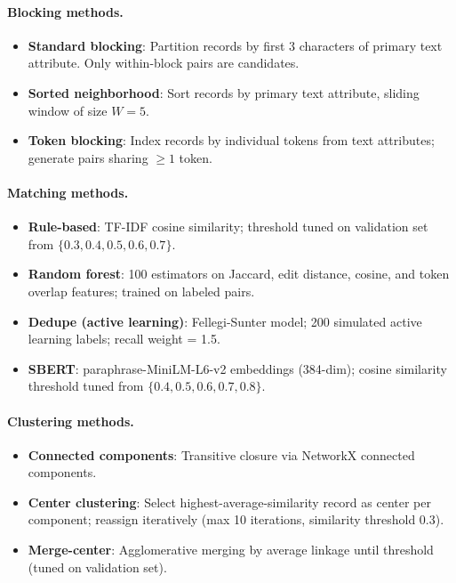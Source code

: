 \documentclass{article}
\begin{document}
\paragraph{Blocking methods.}
\begin{itemize}
    \item \textbf{Standard blocking}: Partition records by first 3 characters of primary text attribute. Only within-block pairs are candidates.
    \item \textbf{Sorted neighborhood}: Sort records by primary text attribute, sliding window of size $W=5$.
    \item \textbf{Token blocking}: Index records by individual tokens from text attributes; generate pairs sharing $\geq 1$ token.
\end{itemize}

\paragraph{Matching methods.}
\begin{itemize}
    \item \textbf{Rule-based}: TF-IDF cosine similarity; threshold tuned on validation set from $\{0.3, 0.4, 0.5, 0.6, 0.7\}$.
    \item \textbf{Random forest}: 100 estimators on Jaccard, edit distance, cosine, and token overlap features; trained on labeled pairs.
    \item \textbf{Dedupe (active learning)}: Fellegi-Sunter model; 200 simulated active learning labels; recall weight = 1.5.
    \item \textbf{SBERT}: paraphrase-MiniLM-L6-v2 embeddings (384-dim); cosine similarity threshold tuned from $\{0.4, 0.5, 0.6, 0.7, 0.8\}$.
\end{itemize}

\paragraph{Clustering methods.}
\begin{itemize}
    \item \textbf{Connected components}: Transitive closure via NetworkX connected components.
    \item \textbf{Center clustering}: Select highest-average-similarity record as center per component; reassign iteratively (max 10 iterations, similarity threshold 0.3).
    \item \textbf{Merge-center}: Agglomerative merging by average linkage until threshold (tuned on validation set).
\end{itemize}
\end{document}
